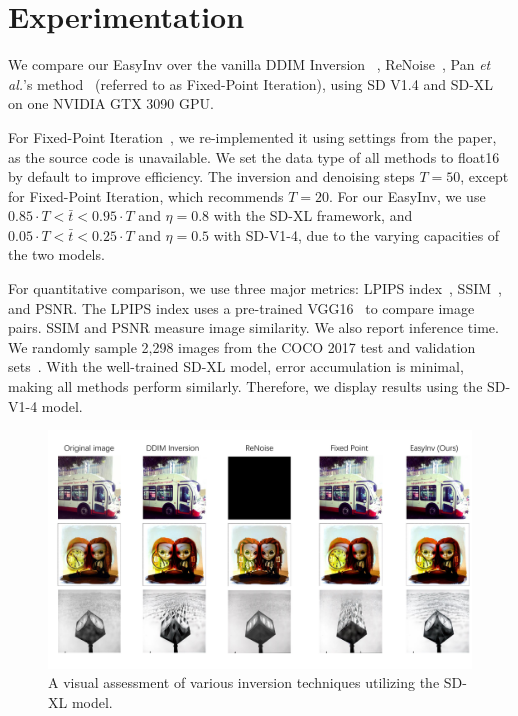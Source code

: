 \documentclass[letterpaper]{article} %
\begin{document}
\section{Experimentation}
\label{exp}


We compare our EasyInv over the vanilla DDIM Inversion ~\cite{couairon2023diffedit}, ReNoise~\cite{garibi2024renoise}, Pan \emph{et al.}'s method~\cite{pan2023effective} (referred to as Fixed-Point Iteration), using SD V1.4 and SD-XL on one NVIDIA GTX 3090 GPU. 
%


For Fixed-Point Iteration~\cite{pan2023effective}, we re-implemented it using settings from the paper, as the source code is unavailable. We set the data type of all methods to float16 by default to improve efficiency. The inversion and denoising steps \(T = 50\), except for Fixed-Point Iteration, which recommends \(T = 20\). For our EasyInv, we use \(0.85 \cdot T < \bar{t} < 0.95 \cdot T\) and \(\eta = 0.8\) with the SD-XL framework, and \(0.05 \cdot T < \bar{t} < 0.25 \cdot T\) and \(\eta = 0.5\) with SD-V1-4, due to the varying capacities of the two models.



For quantitative comparison, we use three major metrics: LPIPS index~\cite{zhang2018unreasonable}, SSIM~\cite{wang2004image}, and PSNR. The LPIPS index uses a pre-trained VGG16~\cite{simonyan2015very} to compare image pairs. SSIM and PSNR measure image similarity. We also report inference time. We randomly sample 2,298 images from the COCO 2017 test and validation sets~\cite{COCO}. With the well-trained SD-XL model, error accumulation is minimal, making all methods perform similarly. Therefore, we display results using the SD-V1-4 model.



\begin{figure}[!t]
    \centering
    \includegraphics[width=0.98\linewidth]{visual_SDXL.pdf}
    \caption{A visual assessment of various inversion techniques utilizing the SD-XL model.}
    \label{SDXL_compare}
\end{figure}
\end{document}
